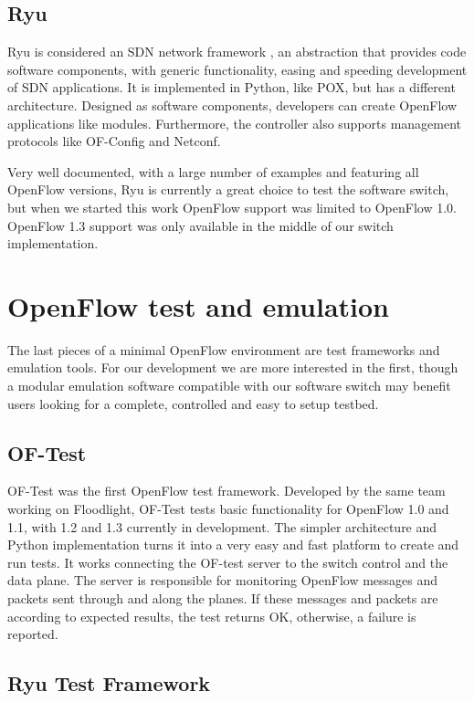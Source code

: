     \subsection{Ryu}
    
    Ryu is considered an SDN network framework \cite{ryu}, an abstraction that provides code software components, with generic functionality, easing and speeding development of SDN applications. It is implemented in Python, like POX, but has a different architecture. Designed as software components, developers can create OpenFlow applications like modules. Furthermore, the controller also supports management protocols like OF-Config and Netconf.
    
    Very well documented, with a large number of examples and featuring all OpenFlow versions, Ryu is currently a great choice to test the software switch, but when we started this work OpenFlow support was limited to OpenFlow 1.0. OpenFlow 1.3 support was only available in the middle of our switch implementation.
 

\section{OpenFlow test and emulation}
\label{sec:testemulation}
    The last pieces of a minimal OpenFlow environment are  test frameworks and emulation tools. For our development we are more interested in the first, though a modular emulation software compatible with our software switch may benefit users looking for a complete, controlled and easy to setup testbed. 
    
    \subsection{OF-Test}
    
    OF-Test was the first OpenFlow test framework. Developed by the same team working on Floodlight, OF-Test \cite{oftest} tests basic functionality for OpenFlow 1.0 and 1.1, with 1.2 and 1.3 currently in development. The simpler architecture and Python implementation turns it into a very easy and fast platform to create and run tests. It works connecting the OF-test server to the switch control and the data plane. The server is responsible for monitoring OpenFlow messages and packets sent through and along the planes. If these messages and packets are according to expected results, the test returns OK, otherwise, a failure is reported.
    
    \subsection{Ryu Test Framework}
    
